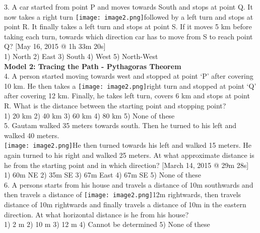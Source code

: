 \documentclass[
]{article}
\begin{document}
3. A car started from point P and moves towards South and stops at point Q. It now takes a right turn \texttt{[image: image2.png]}followed by a left turn and stops at point R. It finally takes a left turn and stops at
point S. If it moves 5 km before taking each turn, towards which direction car has to move from S to reach point Q? [May 16, 2015 @ 1h 33m 20s]\\
1) North \hspace{2mm}2) East \hspace{2mm}3) South \hspace{2mm}4) West \hspace{2mm}5) North-West\\

\textbf{Model 2: Tracing the Path - Pythagoras Theorem}\\
4. A person started moving towards west and stopped at point ‘P’ after covering 10 km. He then takes a \texttt{[image: image2.png]}right turn and stopped at point ‘Q’ after covering 12 km. Finally, he takes left turn, covers 6 km and stops at point R. What is the distance between the starting point and stopping point?\\
1) 20 km \hspace{2mm}2) 40 km \hspace{2mm}3) 60 km \hspace{2mm}4) 80 km \hspace{2mm}5) None of these\\

5. Gautam walked 35 meters towards south. Then he turned to his left and walked 40 meters.\\
\texttt{[image: image2.png]}He then turned towards his left and walked 15 meters. He again turned to his right and walked 25 meters. At what approximate distance is he from the starting point and in which direction? [March 14, 2015 @ 29m 28s]\\
1) 60m NE \hspace{2mm}2) 35m SE \hspace{2mm}3) 67m East \hspace{2mm}4) 67m SE \hspace{2mm}5) None of these\\

6. A persons starts from his house and travels a distance of 10m southwards and then travels a distance of \texttt{[image: image2.png]}12m rightwards, then travels distance of 10m rightwards and finally travels a distance of 10m in the eastern direction. At what horizontal distance is he from his house?\\
1) 2 m \hspace{2mm}2) 10 m \hspace{2mm}3) 12 m
\hspace{2mm}4) Cannot be determined \hspace{2mm}5) None of these\\
\end{document}
